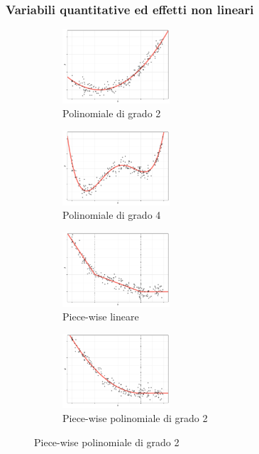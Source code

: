 \documentclass[pdf, aspectratio=169]{beamer}\usepackage[]{graphicx}\usepackage[]{color}
\theoremstyle{definition}
\begin{document}
\begin{frame}
\frametitle{Variabili quantitative ed effetti non lineari}

\fontsize{9pt}{11pt}\selectfont

\begin{figure}
  \centering
  \begin{subfigure}[b]{4.8cm}
    \centering
    \caption{Polinomiale di grado 2}
    \includegraphics[width=4cm]{_bookdown_files/_main_files/figure-latex/expl-var-quant-effect-1.pdf}
  \end{subfigure}
  \qquad
  \begin{subfigure}[b]{4.8cm}
    \centering
    \caption{Polinomiale di grado 4}
    \includegraphics[width=4cm]{_bookdown_files/_main_files/figure-latex/expl-var-quant-effect-2.pdf}
  \end{subfigure}
  \par\medskip
  \begin{subfigure}[b]{4.8cm}
    \centering
    \caption{Piece-wise lineare}
    \includegraphics[width=4cm]{_bookdown_files/_main_files/figure-latex/expl-var-quant-effect-3.pdf}
  \end{subfigure}
  \qquad
  \begin{subfigure}[b]{4.8cm}
    \centering
    \caption{Piece-wise polinomiale di grado 2}
    \includegraphics[width=4cm]{_bookdown_files/_main_files/figure-latex/expl-var-quant-effect-4.pdf}
  \end{subfigure}
\end{figure}

\end{frame}
\end{document}
